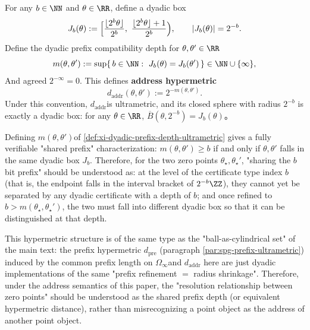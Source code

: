 \begin{definition}\label{def:xi-dyadic-prefix-depth-ultrametric}
For any \(b\in\NN\) ​​and \(\theta\in\RR\), define a dyadic box
\[
J_b(\theta):=\Bigl[\frac{\lfloor 2^b\theta\rfloor}{2^b},\ \frac{\lfloor 2^b\theta\rfloor+1}{2^b}\Bigr),
\qquad |J_b(\theta)|=2^{-b}.
\]
Define the dyadic prefix compatibility depth for \(\theta,\theta'\in\RR\)
\[
m(\theta,\theta'):=\sup\{\,b\in\NN:\ J_b(\theta)=J_b(\theta')\,\}\in\NN\cup\{\infty\},
\]
And agreed \(2^{-\infty}=0\).
This defines \textbf{address hypermetric}
\[
d_{\mathrm{addr}}(\theta,\theta'):=2^{-m(\theta,\theta')}.
\]
Under this convention, \(d_{\mathrm{addr}}\) ​​is ultrametric, and its closed sphere with radius \(2^{-b}\) is exactly a dyadic box: for any \(\theta\in\RR\),
\(
\overline{B}(\theta,2^{-b})=J_b(\theta)
\)。
\end{definition}

\begin{remark}\label{rem:xi-shared-prefix-cert-depth}
Defining \(m(\theta,\theta')\) ​​of \ref{def:xi-dyadic-prefix-depth-ultrametric} gives a fully verifiable "shared prefix" characterization: \(m(\theta,\theta')\ge b\) if and only if \(\theta,\theta'\) falls in the same dyadic box \(J_b\).
Therefore, for the two zero points \(\theta_\star,\theta_\star'\), "sharing the \(b\) bit prefix" should be understood as: at the level of the certificate type index \(b\) (that is, the endpoint falls in the interval bracket of \(2^{-b}\ZZ\)), they cannot yet be separated by any dyadic certificate with a depth of \(b\); and once refined to \(b>m(\theta_\star,\theta_\star')\), the two must fall into different dyadic box so that it can be distinguished at that depth.
\par
This hypermetric structure is of the same type as the "ball-as-cylindrical set" of the main text: the prefix hypermetric \(d_{\mathrm{pre}}\) (paragraph \ref{par:spg-prefix-ultrametric}) induced by the common prefix length on \(\Omega_\infty\) ​​and \(d_{\mathrm{addr}}\) here are just dyadic implementations of the same "prefix refinement \(=\) radius shrinkage".
Therefore, under the address semantics of this paper, the "resolution relationship between zero points" should be understood as the shared prefix depth (or equivalent hypermetric distance), rather than misrecognizing a point object as the address of another point object.
\end{remark}


